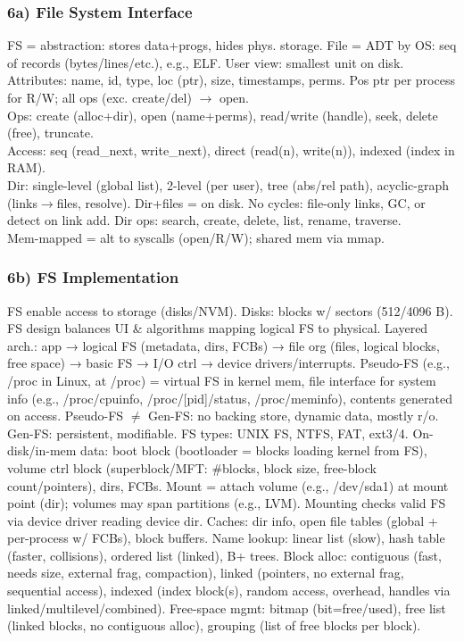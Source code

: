 \subsubsection*{6a) File System Interface}
FS = abstraction: stores data+progs, hides phys. storage. File = ADT by OS: seq of records (bytes/lines/etc.), e.g., ELF. User view: smallest unit on disk. Attributes: name, id, type, loc (ptr), size, timestamps, perms. Pos ptr per process for R/W; all ops (exc. create/del) $\to$ open.\\
Ops: create (alloc+dir), open (name+perms), read/write (handle), seek, delete (free), truncate.\\
Access: seq (read\_next, write\_next), direct (read(n), write(n)), indexed (index in RAM).\\
Dir: single-level (global list), 2-level (per user), tree (abs/rel path), acyclic-graph (links$\to$files, resolve). Dir+files = on disk. No cycles: file-only links, GC, or detect on link add. Dir ops: search, create, delete, list, rename, traverse.\\
Mem-mapped = alt to syscalls (open/R/W); shared mem via mmap.

\subsubsection*{6b) FS Implementation}
FS enable access to storage (disks/NVM). Disks: blocks w/ sectors (512/4096 B).
FS design balances UI \& algorithms mapping logical FS to physical. Layered arch.: app → logical FS (metadata, dirs, FCBs) → file org (files, logical blocks, free space) → basic FS → I/O ctrl → device drivers/interrupts. Pseudo-FS (e.g., /proc in Linux, at /proc) = virtual FS in kernel mem, file interface for system info (e.g., /proc/cpuinfo, /proc/[pid]/status, /proc/meminfo), contents generated on access. Pseudo-FS $\neq$ Gen-FS: no backing store, dynamic data, mostly r/o. Gen-FS: persistent, modifiable.  
FS types: UNIX FS, NTFS, FAT, ext3/4.  
On-disk/in-mem data: boot block (bootloader = blocks loading kernel from FS), volume ctrl block (superblock/MFT: \#blocks, block size, free-block count/pointers), dirs, FCBs. Mount = attach volume (e.g., /dev/sda1) at mount point (dir); volumes may span partitions (e.g., LVM). Mounting checks valid FS via device driver reading device dir.  
Caches: dir info, open file tables (global + per-process w/ FCBs), block buffers.  
Name lookup: linear list (slow), hash table (faster, collisions), ordered list (linked), B+ trees.  
Block alloc: contiguous (fast, needs size, external frag, compaction), linked (pointers, no external frag, sequential access), indexed (index block(s), random access, overhead, handles via linked/multilevel/combined).  
Free-space mgmt: bitmap (bit=free/used), free list (linked blocks, no contiguous alloc), grouping (list of free blocks per block).

